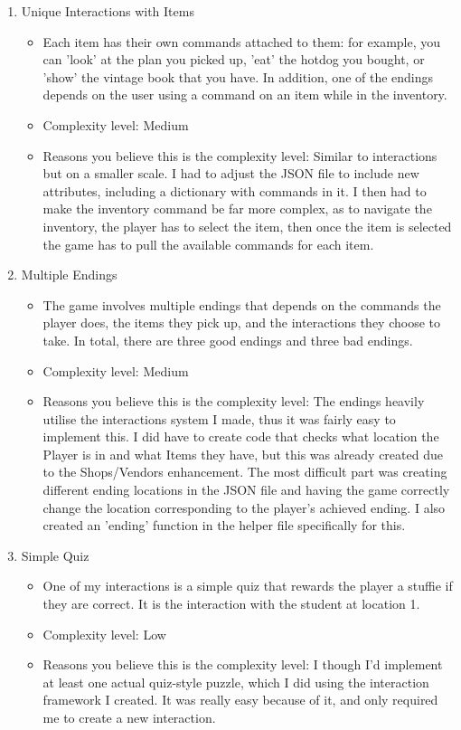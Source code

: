 \documentclass[11pt]{article}
\begin{document}
\begin{enumerate}
\begin{itemize}
    \end{itemize}
    \item Unique Interactions with Items
    \begin{itemize}
        \item Each item has their own commands attached to them: for example, you can 'look' at the plan you picked up, 'eat' the hotdog you bought, or 'show' the vintage book that you have. In addition, one of the endings depends on the user using a command on an item while in the inventory.
        \item Complexity level: Medium
        \item Reasons you believe this is the complexity level: \newline
        Similar to interactions but on a smaller scale. I had to adjust the JSON file to include new attributes, including a dictionary with commands in it. I then had to make the inventory command be far more complex, as to navigate the inventory, the player has to select the item, then once the item is selected the game has to pull the available commands for each item.
    \end{itemize}
    \item Multiple Endings
    \begin{itemize}
        \item The game involves multiple endings that depends on the commands the player does, the items they pick up, and the interactions they choose to take. In total, there are three good endings and three bad endings.
        \item Complexity level: Medium
        \item Reasons you believe this is the complexity level: \newline
        The endings heavily utilise the interactions system I made, thus it was fairly easy to implement this. I did have to create code that checks what location the Player is in and what Items they have, but this was already created due to the Shops/Vendors enhancement. The most difficult part was creating different ending locations in the JSON file and having the game correctly change the location corresponding to the player's achieved ending. I also created an 'ending' function in the helper file specifically for this.
    \end{itemize}
    \item Simple Quiz
    \begin{itemize}
        \item One of my interactions is a simple quiz that rewards the player a stuffie if they are correct. It is the interaction with the student at location 1.
        \item Complexity level: Low
        \item Reasons you believe this is the complexity level: \newline
        I though I'd implement at least one actual quiz-style puzzle, which I did using the interaction framework I created. It was really easy because of it, and only required me to create a new interaction.
    \end{itemize}




\end{enumerate}
\end{document}
